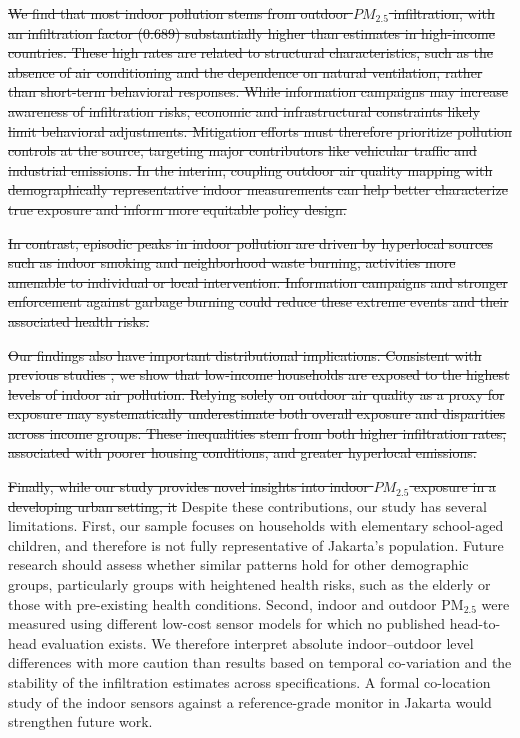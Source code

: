 \documentclass[reqno,12pt,notitlepage]{article}
\providecommand{\DIFadd}[1]{{\protect\color{BLUE}#1}} %
\providecommand{\DIFdel}[1]{{\protect\color{red}\sout{#1}}} %
\providecommand{\DIFaddbegin}{} %
\providecommand{\DIFaddend}{} %
\providecommand{\DIFdelbegin}{} %
\providecommand{\DIFdelend}{} %
\begin{document}
\DIFdelbegin \DIFdel{We find that most indoor pollution stems from outdoor $PM_{2.5}$ infiltration, with an infiltration factor (0.689) substantially higher than estimates in high-income countries. These high rates are related to structural characteristics, such as the absence of air conditioning and the dependence on natural ventilation, rather than short-term behavioral responses. While information campaigns may increase awareness of infiltration risks, economic and infrastructural constraints likely limit behavioral adjustments. Mitigation efforts must therefore prioritize  pollution controls at the source, targeting major contributors like vehicular traffic and industrial emissions. In the interim, coupling outdoor air quality mapping with demographically representative indoor measurements can help better characterize true exposure and inform more equitable policy design.
}

\DIFdel{In contrast, episodic peaks in indoor pollution are driven by hyperlocal sources such as indoor smoking and neighborhood waste burning, activities more amenable to individual or local intervention. 
Information campaigns and stronger enforcement against garbage burning could reduce these extreme events and their associated health risks.
}

\DIFdel{Our findings also have important distributional implications. Consistent with previous studies \citep{greenstone_indoor_2021, burke_exposures_2022, ito_willingness_2020}, we show that low-income households are exposed to the highest levels of indoor air pollution. Relying solely on outdoor air quality as a proxy for exposure may systematically underestimate both overall exposure and disparities across income groups. These inequalities stem from both higher infiltration rates, associated with poorer housing conditions, and greater hyperlocal emissions. 
}

\DIFdel{Finally, while our study provides novel insights into indoor $PM_{2.5}$ exposure in a developing urban setting, it }\DIFdelend \DIFaddbegin \DIFadd{Despite these contributions, our study }\DIFaddend has several limitations. First, our sample focuses on  households with elementary school-aged children, and therefore is not fully representative of Jakarta's population. Future research should assess whether similar patterns hold for other demographic groups, particularly groups with heightened health risks, such as the elderly or those with pre-existing health conditions. Second, \DIFaddbegin \DIFadd{indoor and outdoor PM$_{2.5}$ were measured using different low-cost sensor models for which no published head-to-head evaluation exists. We therefore interpret absolute indoor--outdoor level differences with more caution than results based on temporal co-variation and the stability of the infiltration estimates across specifications. A formal co-location study of the indoor sensors against a reference-grade monitor in Jakarta would strengthen future work. 
}
\end{document}
